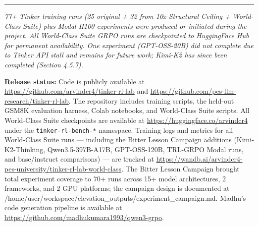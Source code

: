 \documentclass[
  american,
  11pt,
  a4paper,
  oneside]{report}
\begin{document}
\begin{center}\rule{0.5\linewidth}{0.5pt}\end{center}

\emph{77+ Tinker training runs (25 original + 32 from 10x Structural
Ceiling + World-Class Suite) plus Modal H100 experiments were produced
or initiated during the project. All World-Class Suite GRPO runs are
checkpointed to HuggingFace Hub for permanent availability. One
experiment (GPT-OSS-20B) did not complete due to Tinker API stall and
remains for future work; Kimi-K2 has since been completed (Section
4.5.7).}

\textbf{Release status:} Code is publicly available at
\url{https://github.com/arvindcr4/tinker-rl-lab} and
\url{https://github.com/pes-llm-research/tinker-rl-lab}. The repository
includes training scripts, the held-out GSM8K evaluation harness, Colab
notebooks, and World-Class Suite scripts. All World-Class Suite
checkpoints are available at \url{https://huggingface.co/arvindcr4}
under the \texttt{tinker-rl-bench-*} namespace. Training logs and
metrics for all World-Class Suite runs --- including the Bitter Lesson
Campaign additions (Kimi-K2-Thinking, Qwen3.5-397B-A17B, GPT-OSS-120B,
TRL-GRPO Modal runs, and base/instruct comparisons) --- are tracked at
\url{https://wandb.ai/arvindcr4-pes-university/tinker-rl-lab-world-class}.
The Bitter Lesson Campaign brought total experiment coverage to 70+ runs
across 15+ model architectures, 2 frameworks, and 2 GPU platforms; the
campaign design is documented at
/home/user/workspace/elevation\_outputs/experiment\_campaign.md. Madhu's
code generation pipeline is available at
\url{https://github.com/madhukumara1993/qwen3-grpo}.
\end{document}
